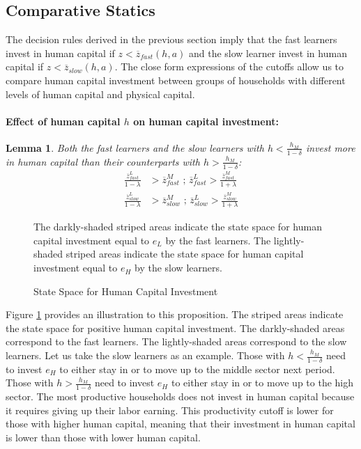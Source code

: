\documentclass[12pt]{article}
\newtheorem{lemma}{Lemma}
\begin{document}
\subsection{Comparative Statics}
The decision rules derived in the previous section imply that the fast learners invest in human capital if $z<\overline{z}_{fast}(h,a)$ and the slow learner invest in human capital if $z<\overline{z}_{slow}(h,a)$. The close form expressions of the cutoffs allow us to compare human capital investment between groups of households with different levels of human capital and physical capital.

\paragraph{Effect of human capital $h$ on human capital investment:} 

\begin{lemma}\label{lem:h_on_e}
    Both the fast learners and the slow learners with $h<\frac{h_M}{1-\delta}$ invest more in human capital than their counterparts with $h>\frac{h_M}{1-\delta}$:
    \begin{align*}
        \frac{\overline{z}^L_{fast}}{1-\lambda} &> \overline{z}^M_{fast} \text{ ; }  \overline{z}^L_{fast}> \frac{\overline{z}^M_{fast}}{1+\lambda}\\
        \frac{\overline{z}^L_{slow}}{1-\lambda} &> \overline{z}^M_{slow} \text{ ; }  \overline{z}^L_{slow}> \frac{\overline{z}^M_{slow}}{1+\lambda}
    \end{align*}
    
\end{lemma}

\begin{figure}
    \centering
    

\caption{State Space for Human Capital Investment}
\begin{flushleft}
\footnotesize{The darkly-shaded striped areas indicate the state space for human capital investment equal to $e_L$ by the fast learners. The lightly-shaded striped areas indicate the state space for human capital investment equal to $e_H$ by the slow learners.} 
\end{flushleft}
    
\label{fig:e-digram}
\end{figure}

Figure \ref{fig:e-digram} provides an illustration to this proposition. The striped areas indicate the state space for positive human capital investment. The darkly-shaded areas correspond to the fast learners. The lightly-shaded areas correspond to the slow learners. Let us take the slow learners as an example. Those with $h<\frac{h_M}{1-\delta}$ need to invest $e_H$ to either stay in or to move up to the middle sector next period. Those with $h>\frac{h_M}{1-\delta}$ need to invest $e_H$ to either stay in or to move up to the high sector. The most productive households does not invest in human capital because it requires giving up their labor earning. This productivity cutoff is lower for those with higher human capital, meaning that their investment in human capital is lower than those with lower human capital. 
\end{document}
